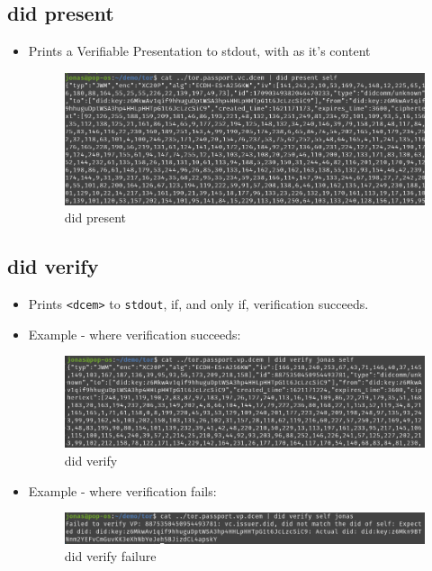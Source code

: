 \hypertarget{did-present}{%
\subsection{\texorpdfstring{did present
}{did present  }}\label{did-present}}

\begin{itemize}
\item
  Prints a Verifiable Presentation to stdout, with as it's content

  \begin{figure}
  \centering
  \includegraphics[width=\textwidth]{User Interface f8759a9462b24d5f95cf6123d68b89ea/Untitled 12.png}
  \caption{did present}
  \end{figure}
\end{itemize}

\hypertarget{did-verify}{%
\subsection{\texorpdfstring{did verify
}{did verify   }}\label{did-verify}}

\begin{itemize}
\item
  Prints \lstinline!<dcem>! to
  \lstinline!stdout!, if, and only if, verification
  succeeds.
\item
  Example - where verification succeeds:

  \begin{figure}
  \centering
  \includegraphics[width=\textwidth]{User Interface f8759a9462b24d5f95cf6123d68b89ea/Untitled 13.png}
  \caption{did verify}
  \end{figure}
\item
  Example - where verification fails:

  \begin{figure}
  \centering
  \includegraphics[width=\textwidth]{User Interface f8759a9462b24d5f95cf6123d68b89ea/Untitled 14.png}
  \caption{did verify failure}
  \end{figure}
\end{itemize}

